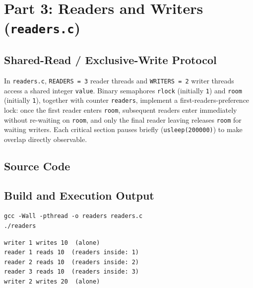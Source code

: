 \documentclass[12pt,a4paper]{article}
\begin{document}
\section{Part 3: Readers and Writers (\texttt{readers.c})}

\subsection{Shared-Read / Exclusive-Write Protocol}
In \texttt{readers.c}, \texttt{READERS = 3} reader threads and \texttt{WRITERS = 2} writer threads access a shared integer \texttt{value}. Binary semaphores \texttt{rlock} (initially \texttt{1}) and \texttt{room} (initially \texttt{1}), together with counter \texttt{readers}, implement a first-readers-preference lock: once the first reader enters \texttt{room}, subsequent readers enter immediately without re-waiting on \texttt{room}, and only the final reader leaving releases \texttt{room} for waiting writers. Each critical section pauses briefly (\texttt{usleep(200000)}) to make overlap directly observable.

\newpage
\subsection{Source Code}


\newpage
\subsection{Build and Execution Output}
\begin{lstlisting}[style=bashstyle]
gcc -Wall -pthread -o readers readers.c
./readers
\end{lstlisting}

\begin{lstlisting}[style=consolestyle, caption={Observed output of \texttt{./readers} (exit code \texttt{0})}]
writer 1 writes 10  (alone)
reader 1 reads 10  (readers inside: 1)
reader 2 reads 10  (readers inside: 2)
reader 3 reads 10  (readers inside: 3)
writer 2 writes 20  (alone)
\end{lstlisting}
\end{document}
